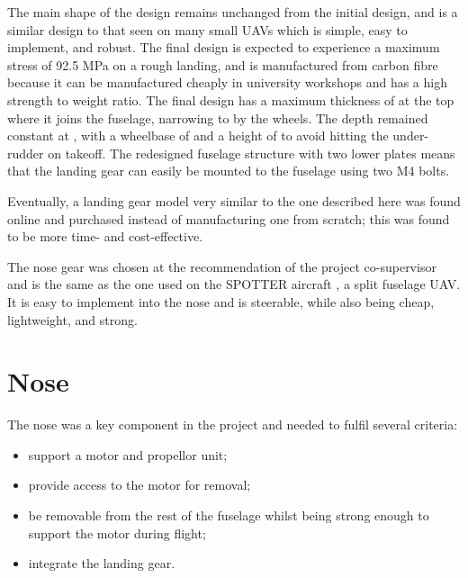 \documentclass[../../main.tex]{subfiles}
\begin{document}
The main shape of the design remains unchanged from the initial design, and is a similar design to that seen on many small UAVs which is simple, easy to implement, and robust.
The final design is expected to experience a maximum stress of 92.5 MPa on a rough landing, and is manufactured from carbon fibre because it can be manufactured cheaply in university workshops and has a high strength to weight ratio.
The final design has a maximum thickness of  at the top where it joins the fuselage, narrowing to  by the wheels.
The depth remained constant at , with a wheelbase of  and a height of  to avoid hitting the under-rudder on takeoff.
The redesigned fuselage structure with two lower plates means that the landing gear can easily be mounted to the fuselage using two M4 bolts. 

Eventually, a landing gear model very similar to the one described here was found online and purchased instead of manufacturing one from scratch; this was found to be more time- and cost-effective.


The nose gear was chosen at the recommendation of the project co-supervisor and is the same as the one used on the SPOTTER aircraft \cite{spotter-19}, a  split fuselage UAV.
It is easy to implement into the nose and is steerable, while also being cheap, lightweight, and strong. 

\section{Nose} \label{sec:final-design-proposal:nose}


The nose was a key component in the project and needed to fulfil several criteria:

\begin{itemize}
    \item support a motor and propellor unit;
    \item provide access to the motor for removal;
    \item be removable from the rest of the fuselage whilst being strong enough to support the motor during flight;
    \item integrate the landing gear.
\end{itemize}
\end{document}
